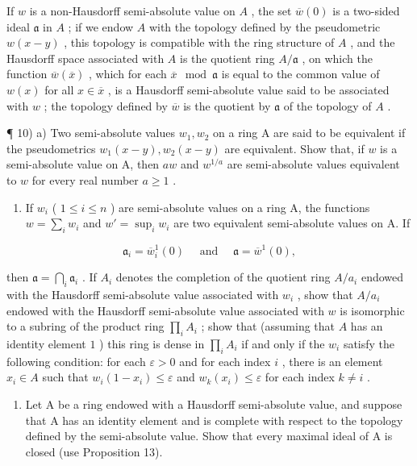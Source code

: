If \(w\) is a non-Hausdorff semi-absolute value on \(A\) , the set \(\overline{w}(0)\) is a two-sided ideal \(\mathfrak{a}\) in \(A\) ; if we endow \(A\) with the topology defined by the pseudometric \(w(x - y)\) , this topology is compatible with the ring structure of \(A\) , and the Hausdorff space associated with \(A\) is the quotient ring \(A / \mathfrak{a}\) , on which the function \(\overline{w}(\overline{x})\) , which for each \(\overline{x} \mod \mathfrak{a}\) is equal to the common value of \(w(x)\) for all \(x \in \overline{x}\) , is a Hausdorff semi-absolute value said to be associated with \(w\) ; the topology defined by \(\overline{w}\) is the quotient by \(\mathfrak{a}\) of the topology of \(A\) .

¶ 10) a) Two semi-absolute values \(w_1, w_2\) on a ring A are said to be equivalent if the pseudometrics \(w_1(x - y), w_2(x - y)\) are equivalent. Show that, if \(w\) is a semi-absolute value on A, then \(aw\) and \(w^{1/a}\) are semi-absolute values equivalent to \(w\) for every real number \(a \geqslant 1\) .

\begin{enumerate}
\def\labelenumi{\alph{enumi})}
\setcounter{enumi}{1}
\tightlist
\item
  If \(w_{i}\) ( \(1 \leqslant i \leqslant n\) ) are semi-absolute values on a ring A, the functions \(w = \sum_{i} w_{i}\) and \(w' = \sup_{i} w_{i}\) are two equivalent semi-absolute values on A. If
\end{enumerate}

\[
\mathfrak {a} _ {i} = \overline {{{w}}} _ {i} ^ {1} (\mathrm{0}) \quad \text { and } \quad \mathfrak {a} = \overline {{{w}}} ^ {1} (\mathrm{0}),
\]

then \(\mathfrak{a} = \bigcap_{i} \mathfrak{a}_{i}\) . If \(A_i\) denotes the completion of the quotient ring \(A/a_i\) endowed with the Hausdorff semi-absolute value associated with \(w_i\) , show that \(A/a_i\) endowed with the Hausdorff semi-absolute value associated with \(w\) is isomorphic to a subring of the product ring \(\prod_{i} A_i\) ; show that (assuming that \(A\) has an identity element \(1\) ) this ring is dense in \(\prod_{i} A_i\) if and only if the \(w_i\) satisfy the following condition: for each \(\varepsilon > 0\) and for each index \(i\) , there is an element \(x_i \in A\) such that \(w_i(1 - x_i) \leqslant \varepsilon\) and \(w_k(x_i) \leqslant \varepsilon\) for each index \(k \neq i\) .

\begin{enumerate}
\def\labelenumi{\arabic{enumi})}
\setcounter{enumi}{10}
\tightlist
\item
  Let A be a ring endowed with a Hausdorff semi-absolute value, and suppose that A has an identity element and is complete with respect to the topology defined by the semi-absolute value. Show that every maximal ideal of A is closed (use Proposition 13).
\end{enumerate}

